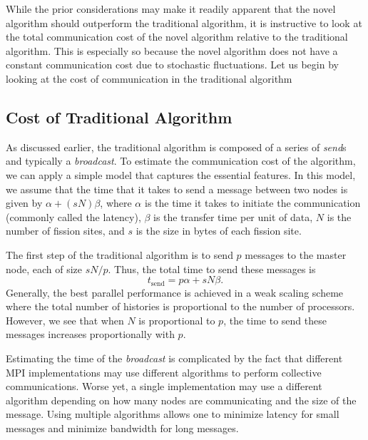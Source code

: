 While the prior considerations may make it readily apparent that the
novel algorithm should outperform the traditional algorithm, it is
instructive to look at the total communication cost of the novel
algorithm relative to the traditional algorithm. This is especially so
because the novel algorithm does not have a constant communication
cost due to stochastic fluctuations. Let us begin by looking at the
cost of communication in the traditional algorithm

\subsection{Cost of Traditional Algorithm}
\label{sec:traditional-cost}

As discussed earlier, the traditional algorithm is composed of a
series of \emph{send}s and typically a \emph{broadcast}. To estimate
the communication cost of the algorithm, we can apply a simple model
that captures the essential features. In this model, we assume that
the time that it takes to send a message between two nodes is given by
$\alpha + (sN)\beta$, where $\alpha$ is the time it takes to initiate
the communication (commonly called the latency), $\beta$ is the
transfer time per unit of data, $N$ is the number of fission sites,
and $s$ is the size in bytes of each fission site.

The first step of the traditional algorithm is to send $p$ messages to
the master node, each of size $sN/p$. Thus, the total time to send
these messages is
\begin{equation}\label{eq:t-send}
  t_{\text{send}} = p\alpha + sN\beta.
\end{equation}
Generally, the best parallel performance is achieved in a weak scaling
scheme where the total number of histories is proportional to the
number of processors. However, we see that when $N$ is proportional to
$p$, the time to send these messages increases proportionally with
$p$.

Estimating the time of the \emph{broadcast} is complicated by the fact
that different MPI implementations may use different algorithms to
perform collective communications. Worse yet, a single implementation
may use a different algorithm depending on how many nodes are
communicating and the size of the message. Using multiple algorithms
allows one to minimize latency for small messages and minimize
bandwidth for long messages.

